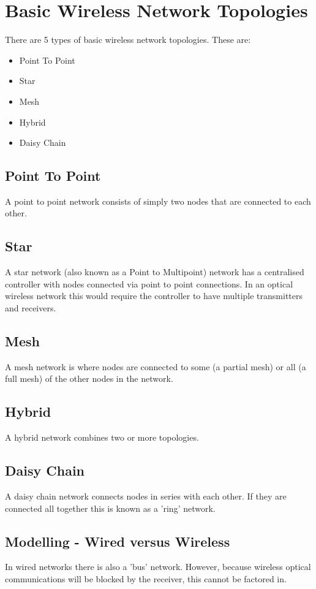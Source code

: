 \section{Basic Wireless Network Topologies}
There are 5 types of basic wireless network topologies. These are:

\begin{itemize}
\item{Point To Point}
\item{Star}
\item{Mesh}
\item{Hybrid}
\item{Daisy Chain}
\end{itemize}

\subsection{Point To Point}
A point to point network consists of simply two nodes that are connected to each
other.

\subsection{Star}
A star network (also known as a Point to Multipoint) network has a centralised
controller with nodes connected via point to point connections. In an optical
wireless network this would require the controller to have multiple transmitters
and receivers.

\subsection{Mesh}
A mesh network is where nodes are connected to some (a partial mesh) or all
(a full mesh) of the other nodes in the network.

\subsection{Hybrid}
A hybrid network combines two or more topologies.

\subsection{Daisy Chain}
A daisy chain network connects nodes in series with each other. If they are
connected all together this is known as a 'ring' network.

\subsection{Modelling - Wired versus Wireless}
In wired networks there is also a 'bus' network. However, because wireless
optical communications will be blocked by the receiver, this cannot be factored
in.

